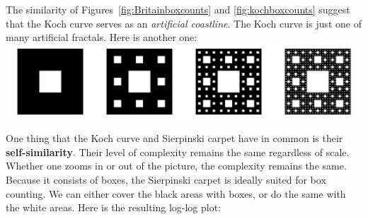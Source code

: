 The similarity of Figures~\ref{fig:Britainboxcounts} and
\ref{fig:kochboxcounts} suggest that the Koch curve serves as an
\emph{artificial coastline}. The Koch curve is just one of many
artificial fractals. Here is another one:\\

\noindent\includegraphics[width=\textwidth]{../figures/sierpinski.pdf}
\begingroup {}
\label{fig:sierpinski}
\endgroup

One thing that the Koch curve and Sierpinski carpet have in common
is their \textbf{self-similarity}. Their level of complexity remains
the same regardless of scale. Whether one zooms in or out of the picture,
the complexity remains the same.\\

Because it consists of boxes, the Sierpinski carpet is ideally suited
for box counting. We can either cover the black areas with boxes, or
do the same with the white areas. Here is the resulting log-log
plot:\\

